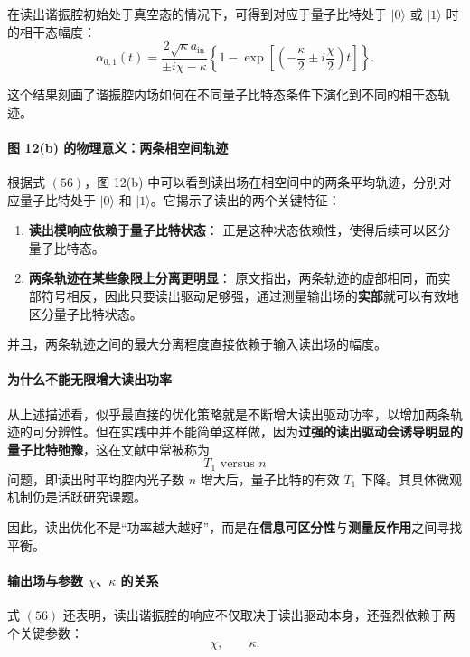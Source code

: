 \documentclass[12pt,a4paper,oneside]{ctexbook}
\begin{document}
在读出谐振腔初始处于真空态的情况下，可得到对应于量子比特处于 \(|0\rangle\) 或 \(|1\rangle\) 时的相干态幅度：
\begin{equation}
\alpha_{0,1}(t)
=
\frac{2\sqrt{\kappa}a_{\mathrm{in}}}{\pm i\chi-\kappa}
\left\{
1-\exp\left[\left(-\frac{\kappa}{2}\pm i\frac{\chi}{2}\right)t\right]
\right\}.
\tag{56}
\end{equation}

这个结果刻画了谐振腔内场如何在不同量子比特态条件下演化到不同的相干态轨迹。

\paragraph{图 12(b) 的物理意义：两条相空间轨迹}
根据式 \((56)\)，图 12(b) 中可以看到读出场在相空间中的两条平均轨迹，分别对应量子比特处于 \(|0\rangle\) 和 \(|1\rangle\)。它揭示了读出的两个关键特征：

\begin{enumerate}
    \item \textbf{读出模响应依赖于量子比特状态}：
    正是这种状态依赖性，使得后续可以区分量子比特态。

    \item \textbf{两条轨迹在某些象限上分离更明显}：
    原文指出，两条轨迹的虚部相同，而实部符号相反，因此只要读出驱动足够强，通过测量输出场的\textbf{实部}就可以有效地区分量子比特状态。
\end{enumerate}

并且，两条轨迹之间的最大分离程度直接依赖于输入读出场的幅度。

\paragraph{为什么不能无限增大读出功率}
从上述描述看，似乎最直接的优化策略就是不断增大读出驱动功率，以增加两条轨迹的可分辨性。但在实践中并不能简单这样做，因为\textbf{过强的读出驱动会诱导明显的量子比特弛豫}，这在文献中常被称为
\[
T_1 \text{ versus } n
\]
问题，即读出时平均腔内光子数 \(n\) 增大后，量子比特的有效 \(T_1\) 下降。其具体微观机制仍是活跃研究课题。

因此，读出优化不是“功率越大越好”，而是在\textbf{信息可区分性}与\textbf{测量反作用}之间寻找平衡。

\paragraph{输出场与参数 \(\chi\)、\(\kappa\) 的关系}
式 \((56)\) 还表明，读出谐振腔的响应不仅取决于读出驱动本身，还强烈依赖于两个关键参数：
\[
\chi,\qquad \kappa.
\]
\end{document}
